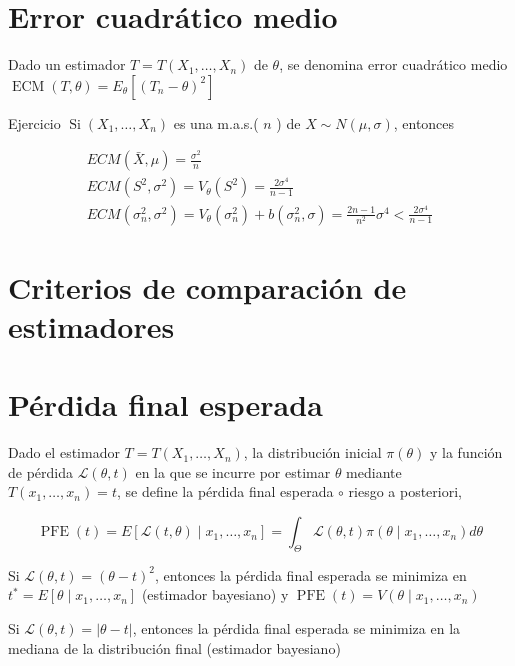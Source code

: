 \section*{Error cuadrático medio}
Dado un estimador $T=T\left(X_{1}, \ldots, X_{n}\right)$ de $\theta$, se denomina error cuadrático medio $\operatorname{ECM}(T, \theta)=E_{\theta}\left[\left(T_{n}-\theta\right)^{2}\right]$

Ejercicio $\operatorname{Si}\left(X_{1}, \ldots, X_{n}\right)$ es una m.a.s.( $n$ ) de $X \sim N(\mu, \sigma)$, entonces

$$
  \begin{gathered}
    E C M(\bar{X}, \mu)=\frac{\sigma^{2}}{n} \\
    E C M\left(S^{2}, \sigma^{2}\right)=V_{\theta}\left(S^{2}\right)=\frac{2 \sigma^{4}}{n-1} \\
    E C M\left(\sigma_{n}^{2}, \sigma^{2}\right)=V_{\theta}\left(\sigma_{n}^{2}\right)+b\left(\sigma_{n}^{2}, \sigma\right)=\frac{2 n-1}{n^{2}} \sigma^{4}<\frac{2 \sigma^{4}}{n-1}
  \end{gathered}
$$

\section*{Criterios de comparación de estimadores}
\section*{Pérdida final esperada}
Dado el estimador $T=T\left(X_{1}, \ldots, X_{n}\right)$, la distribución inicial $\pi(\theta)$ y la función de pérdida $\mathcal{L}(\theta, t)$ en la que se incurre por estimar $\theta$ mediante $T\left(x_{1}, \ldots, x_{n}\right)=t$, se define la pérdida final esperada $\circ$ riesgo a posteriori,

$$
  \operatorname{PFE}(t)=E\left[\mathcal{L}(t, \theta) \mid x_{1}, \ldots, x_{n}\right]=\int_{\Theta} \mathcal{L}(\theta, t) \pi\left(\theta \mid x_{1}, \ldots, x_{n}\right) d \theta
$$

Si $\mathcal{L}(\theta, t)=(\theta-t)^{2}$, entonces la pérdida final esperada se minimiza en $t^{*}=E\left[\theta \mid x_{1}, \ldots, x_{n}\right]$ (estimador bayesiano) y $\operatorname{PFE}(t)=V\left(\theta \mid x_{1}, \ldots, x_{n}\right)$

Si $\mathcal{L}(\theta, t)=|\theta-t|$, entonces la pérdida final esperada se minimiza en la mediana de la distribución final (estimador bayesiano)

